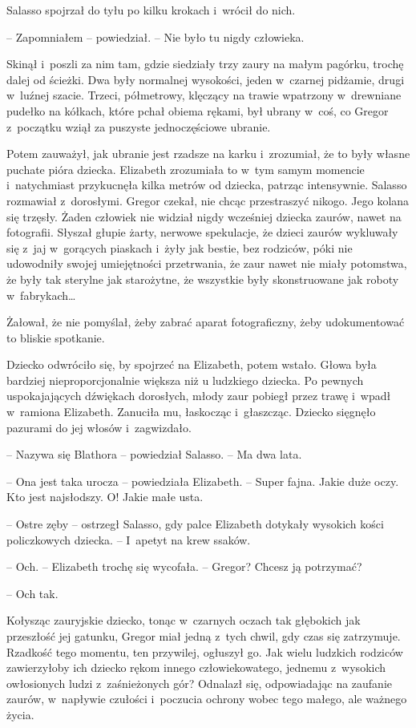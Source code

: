 \documentclass[oneside,polish,12pt,sfheadings]{mwbk}
\begin{document}
Salasso spojrzał do tyłu po kilku krokach i~wrócił do nich.

-- Zapomniałem -- powiedział. -- Nie było tu nigdy człowieka.

Skinął i~poszli za nim tam, gdzie siedziały trzy zaury na małym pagórku,
trochę dalej od ścieżki. Dwa były normalnej wysokości, jeden w~czarnej
pidżamie, drugi w~luźnej szacie. Trzeci, półmetrowy, klęczący na trawie
wpatrzony w~drewniane pudełko na kółkach, które pchał obiema rękami, był
ubrany w~coś, co Gregor z~początku wziął za puszyste jednoczęściowe
ubranie.

Potem zauważył, jak ubranie jest rzadsze na karku i~zrozumiał, że to
były własne puchate pióra dziecka. Elizabeth zrozumiała to w~tym samym
momencie i~natychmiast przykucnęła kilka metrów od dziecka, patrząc
intensywnie. Salasso rozmawiał z~dorosłymi. Gregor czekał, nie chcąc
przestraszyć nikogo. Jego kolana się trzęsły. Żaden człowiek nie widział
nigdy wcześniej dziecka zaurów, nawet na fotografii. Słyszał głupie
żarty, nerwowe spekulacje, że dzieci zaurów wykluwały się z~jaj w~gorących piaskach i~żyły jak bestie, bez rodziców, póki nie udowodniły
swojej umiejętności przetrwania, że zaur nawet nie miały potomstwa, że
były tak sterylne jak starożytne, że wszystkie były skonstruowane jak
roboty w~fabrykach\ldots

Żałował, że nie pomyślał, żeby zabrać aparat fotograficzny, żeby
udokumentować to bliskie spotkanie.

Dziecko odwróciło się, by spojrzeć na Elizabeth, potem wstało. Głowa
była bardziej nieproporcjonalnie większa niż u ludzkiego dziecka. Po
pewnych uspokajających dźwiękach dorosłych, młody zaur pobiegł przez
trawę i~wpadł w~ramiona Elizabeth. Zanuciła mu, łaskocząc i~głaszcząc.
Dziecko sięgnęło pazurami do jej włosów i~zagwizdało.

-- Nazywa się Blathora -- powiedział Salasso. -- Ma dwa lata.

-- Ona jest taka urocza -- powiedziała Elizabeth. -- Super fajna. Jakie
duże oczy. Kto jest najsłodszy. O! Jakie małe usta.

-- Ostre zęby -- ostrzegł Salasso, gdy palce Elizabeth dotykały wysokich
kości policzkowych dziecka. -- I~apetyt na krew ssaków.

-- Och. -- Elizabeth trochę się wycofała. -- Gregor? Chcesz ją potrzymać?

-- Och tak.

Kołysząc zauryjskie dziecko, tonąc w~czarnych oczach tak głębokich jak
przeszłość jej gatunku, Gregor miał jedną z~tych chwil, gdy czas się
zatrzymuje. Rzadkość tego momentu, ten przywilej, ogłuszył go. Jak wielu
ludzkich rodziców zawierzyłoby ich dziecko rękom innego człowiekowatego,
jednemu z~wysokich owłosionych ludzi z~zaśnieżonych gór? Odnalazł się,
odpowiadając na zaufanie zaurów, w~napływie czułości i~poczucia ochrony
wobec tego małego, ale ważnego życia.
\end{document}
